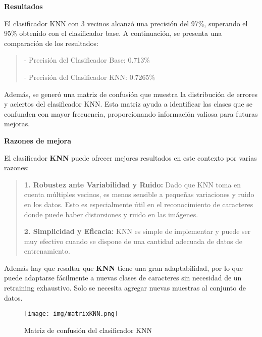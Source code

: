 \documentclass[a4paper, 12pt]{article}
\begin{document}
\textbf{Resultados}

El clasificador KNN con 3 vecinos alcanzó una precisión del 97\%, superando el 95\% obtenido con el clasificador base. A continuación, se presenta una comparación de los resultados:

\begin{quote}
	- Precisión del Clasificador Base: 0.713\%
	
	- Precisión del Clasificador KNN: 0.7265\%
\end{quote}

Además, se generó una matriz de confusión que muestra la distribución de errores y aciertos del clasificador KNN. Esta matriz ayuda a identificar las clases que se confunden con mayor frecuencia, proporcionando información valiosa para futuras mejoras.

\textbf{Razones de mejora}

El clasificador \textbf{KNN} puede ofrecer mejores resultados en este contexto por varias razones:
\begin{quote}
	\textbf{1. Robustez ante Variabilidad y Ruido:} Dado que KNN toma en cuenta múltiples vecinos, es menos sensible a pequeñas variaciones y ruido en los datos. Esto es especialmente útil en el reconocimiento de caracteres donde puede haber distorsiones y ruido en las imágenes.

	\textbf{2. Simplicidad y Eficacia:} KNN es simple de implementar y puede ser muy efectivo cuando se dispone de una cantidad adecuada de datos de entrenamiento. 
	
\end{quote}

Además hay que resaltar que \textbf{KNN} tiene una gran adaptabilidad, por lo que puede adaptarse fácilmente a nuevas clases de caracteres sin necesidad de un retraining exhaustivo. Solo se necesita agregar nuevas muestras al conjunto de datos.

\begin{figure}[h]
	\centering
	\texttt{[image: img/matrixKNN.png]}
	\caption{Matriz de confusión del clasificador KNN}
	\label{fig:matrixknn}
\end{figure}
\end{document}
